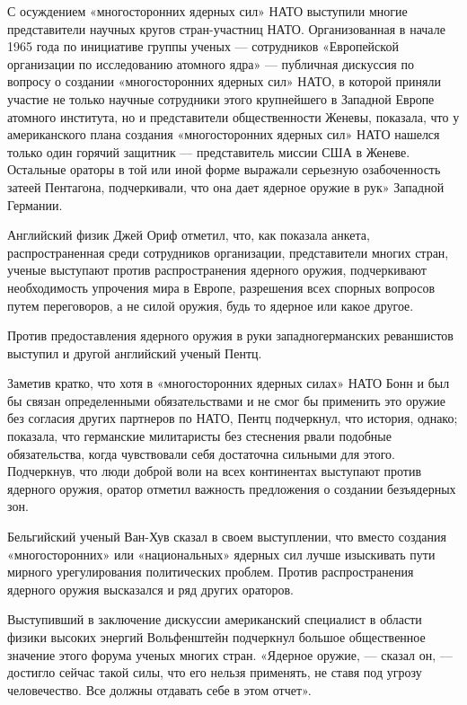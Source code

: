 \documentclass[12pt, a4paper, openany]{book}
\begin{document}
	С осуждением «многосторонних ядерных сил» НАТО выступили многие представители научных кругов стран-участниц НАТО. Организованная в начале 1965 года по инициативе группы ученых — сотрудников «Европейской организации по исследованию атомного ядра» — публичная дискуссия по вопросу о создании «многосторонних ядерных сил» НАТО, в которой приняли участие не только научные сотрудники этого крупнейшего в Западной Европе атомного института, но и представители общественности Женевы, показала, что у американского плана создания «многосторонних ядерных сил» НАТО нашелся только один горячий защитник — представитель миссии США в Женеве. Остальные ораторы в той или иной форме выражали серьезную озабоченность затеей Пентагона, подчеркивали, что она дает ядерное оружие в рук» Западной Германии.
	
	Английский физик Джей Ориф отметил, что, как показала анкета, распространенная среди сотрудников организации, представители многих стран, ученые выступают против распространения ядерного оружия, подчеркивают необходимость упрочения мира в Европе, разрешения всех спорных вопросов путем переговоров, а не силой оружия, будь то ядерное или какое другое.
	
	Против предоставления ядерного оружия в руки западногерманских реваншистов выступил и другой английский ученый Пентц.
	
	Заметив кратко, что хотя в «многосторонних ядерных силах» НАТО Бонн и был бы связан определенными обязательствами и не смог бы применить это оружие без согласия других партнеров по НАТО, Пентц подчеркнул, что история, однако; показала, что германские милитаристы без стеснения рвали подобные обязательства, когда чувствовали себя достаточна сильными для этого. Подчеркнув, что люди доброй воли на всех континентах выступают против ядерного оружия, оратор отметил важность предложения о создании безъядерных зон.
	
	Бельгийский ученый Ван-Хув сказал в своем выступлении, что вместо создания «многосторонних» или «национальных» ядерных сил лучше изыскивать пути мирного урегулирования политических проблем. Против распространения ядерного оружия высказался и ряд других ораторов.
	
	Выступивший в заключение дискуссии американский специалист в области физики высоких энергий Вольфенштейн подчеркнул большое общественное значение этого форума ученых многих стран. «Ядерное оружие, — сказал он, — достигло сейчас такой силы, что его нельзя применять, не ставя под угрозу человечество. Все должны отдавать себе в этом отчет».
	
\end{document}
